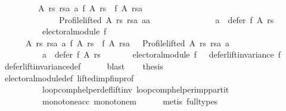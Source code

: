 \begin{isabellebody}
\ \ \ \ \ \ \ \ \ {\isacharparenleft}{\kern0pt}{\isasymexists}A\ rs\ rsa\ a{\isachardot}{\kern0pt}\ f\ A\ rs\ {\isasymnoteq}\ f\ A\ rsa\ {\isasymand}\isanewline
\ \ \ \ \ \ \ \ \ \ \ \ \ \ Profile{\isachardot}{\kern0pt}lifted\ A\ rs\ rsa\ {\isacharparenleft}{\kern0pt}a{\isacharcolon}{\kern0pt}{\isacharcolon}{\kern0pt}{\isacharprime}{\kern0pt}a{\isacharparenright}{\kern0pt}\ {\isasymand}\isanewline
\ \ \ \ \ \ \ \ \ \ \ \ \ \ a\ {\isasymin}\ defer\ f\ A\ rs{\isacharparenright}{\kern0pt}\ {\isasymor}\isanewline
\ \ \ \ \ \ \ \ \ {\isasymnot}\ electoral{\isacharunderscore}{\kern0pt}module\ f{\isacharparenright}{\kern0pt}\ {\isasymand}\isanewline
\ \ \ \ \ \ {\isacharparenleft}{\kern0pt}{\isacharparenleft}{\kern0pt}{\isasymforall}A\ rs\ rsa\ a{\isachardot}{\kern0pt}\ f\ A\ rs\ {\isacharequal}{\kern0pt}\ f\ A\ rsa\ {\isasymor}\ {\isasymnot}\ Profile{\isachardot}{\kern0pt}lifted\ A\ rs\ rsa\ a\ {\isasymor}\isanewline
\ \ \ \ \ \ \ \ \ \ a\ {\isasymnotin}\ defer\ f\ A\ rs{\isacharparenright}{\kern0pt}\ {\isasymand}\isanewline
\ \ \ \ \ \ electoral{\isacharunderscore}{\kern0pt}module\ f\ {\isasymor}\ {\isasymnot}\ defer{\isacharunderscore}{\kern0pt}lift{\isacharunderscore}{\kern0pt}invariance\ f{\isacharparenright}{\kern0pt}{\isachardoublequoteclose}\isanewline
\ \ \ \ \isamarkupfalse%
\ defer{\isacharunderscore}{\kern0pt}lift{\isacharunderscore}{\kern0pt}invariance{\isacharunderscore}{\kern0pt}def\isanewline
\ \ \ \ \isamarkupfalse%
\ blast\isanewline
\ \ \isamarkupfalse%
\ {\isacharquery}{\kern0pt}thesis\isanewline
\ \ \ \ \isamarkupfalse%
\ electoral{\isacharunderscore}{\kern0pt}module{\isacharunderscore}{\kern0pt}def\ lifted{\isacharunderscore}{\kern0pt}imp{\isacharunderscore}{\kern0pt}fin{\isacharunderscore}{\kern0pt}prof\isanewline
\ \ \ \ \ \ \ \ \ \ loop{\isacharunderscore}{\kern0pt}comp{\isacharunderscore}{\kern0pt}helper{\isacharunderscore}{\kern0pt}def{\isacharunderscore}{\kern0pt}lift{\isacharunderscore}{\kern0pt}inv\ loop{\isacharunderscore}{\kern0pt}comp{\isacharunderscore}{\kern0pt}helper{\isacharunderscore}{\kern0pt}imp{\isacharunderscore}{\kern0pt}partit\isanewline
\ \ \ \ \ \ \ \ \ \ monotone{\isacharunderscore}{\kern0pt}acc\ monotone{\isacharunderscore}{\kern0pt}m\isanewline
\ \ \ \ \isamarkupfalse%
\ {\isacharparenleft}{\kern0pt}metis\ {\isacharparenleft}{\kern0pt}full{\isacharunderscore}{\kern0pt}types{\isacharparenright}{\kern0pt}{\isacharparenright}{\kern0pt}\isanewline
{}\isamarkupfalse%
%
\endisatagproof
{\isafoldproof}%
%
\isadelimproof
\isanewline

\end{isabellebody}

